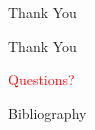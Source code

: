 \documentclass{beamer}
\begin{document}
 \begin{frame}{Thank You}
   \begin{center}
     \Huge{Thank You}\\
     \end{center}
     \end{frame}
\begin{frame}
\begin{center}
     \LARGE{\textcolor{red}{Questions?}}
     \end{center}
   \end{frame}
    \begin{frame}[allowframebreaks]{Bibliography}
 
       
   {\tiny }

 \end{frame}
\end{document}
